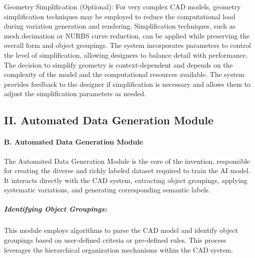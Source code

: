 \documentclass{article}
\begin{document}
Geometry Simplification (Optional): For very complex CAD models, geometry simplification techniques may be employed to reduce the computational load during variation generation and rendering. Simplification techniques, such as mesh decimation or NURBS curve reduction, can be applied while preserving the overall form and object groupings. The system incorporates parameters to control the level of simplification, allowing designers to balance detail with performance. The decision to simplify geometry is context-dependent and depends on the complexity of the model and the computational resources available. The system provides feedback to the designer if simplification is necessary and allows them to adjust the simplification parameters as needed.

\subsection{II. Automated Data Generation Module}

\paragraph{B. Automated Data Generation Module}

The Automated Data Generation Module is the core of the invention, responsible for creating the diverse and richly labeled dataset required to train the AI model.  It interacts directly with the CAD system, extracting object groupings, applying systematic variations, and generating corresponding semantic labels.

\subparagraph{Identifying Object Groupings:} This module employs algorithms to parse the CAD model and identify object groupings based on user-defined criteria or pre-defined rules.  This process leverages the hierarchical organization mechanisms within the CAD system.
\end{document}
